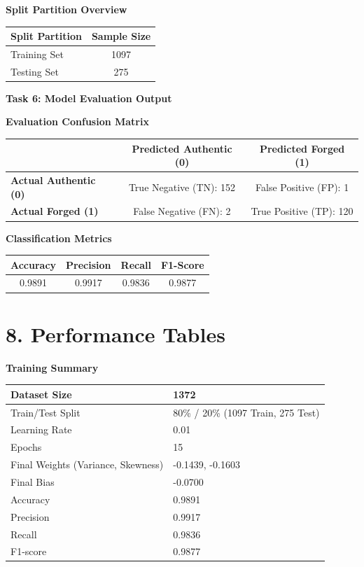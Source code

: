 \documentclass[11pt]{article}
\begin{document}
\vspace{4mm}
\noindent\textbf{Split Partition Overview}

\vspace{2mm}
\noindent\begin{tabular}{|l|c|}
\hline
\textbf{Split Partition} & \textbf{Sample Size}\\
\hline
Training Set & 1097 \\
Testing Set & 275 \\
\hline
\end{tabular}

\vspace{6mm}
\noindent\textbf{Task 6: Model Evaluation Output}

\vspace{4mm}
\noindent\textbf{Evaluation Confusion Matrix}

\vspace{2mm}
\noindent\begin{tabular}{|l|c|c|}
\hline
& \textbf{Predicted Authentic (0)} & \textbf{Predicted Forged (1)} \\
\hline
\textbf{Actual Authentic (0)} & True Negative (TN): 152 & False Positive (FP): 1 \\
\hline
\textbf{Actual Forged (1)} & False Negative (FN): 2 & True Positive (TP): 120 \\
\hline
\end{tabular}

\vspace{4mm}
\noindent\textbf{Classification Metrics}

\vspace{2mm}
\noindent\begin{tabular}{|c|c|c|c|}
\hline
\textbf{Accuracy} & \textbf{Precision} & \textbf{Recall} & \textbf{F1-Score} \\
\hline
0.9891 & 0.9917 & 0.9836 & 0.9877 \\
\hline
\end{tabular}

\section*{8. Performance Tables}

\textbf{Training Summary}

\vspace{2mm}
\begin{tabular}{|p{6cm}|p{7cm}|}
\hline
Dataset Size & 1372 \\
\hline
Train/Test Split & 80\% / 20\% (1097 Train, 275 Test) \\
\hline
Learning Rate & 0.01 \\
\hline
Epochs & 15 \\
\hline
Final Weights (Variance, Skewness) & -0.1439, -0.1603 \\
\hline
Final Bias & -0.0700 \\
\hline
Accuracy & 0.9891 \\
\hline
Precision & 0.9917 \\
\hline
Recall & 0.9836 \\
\hline
F1-score & 0.9877 \\
\hline
\end{tabular}
\end{document}
